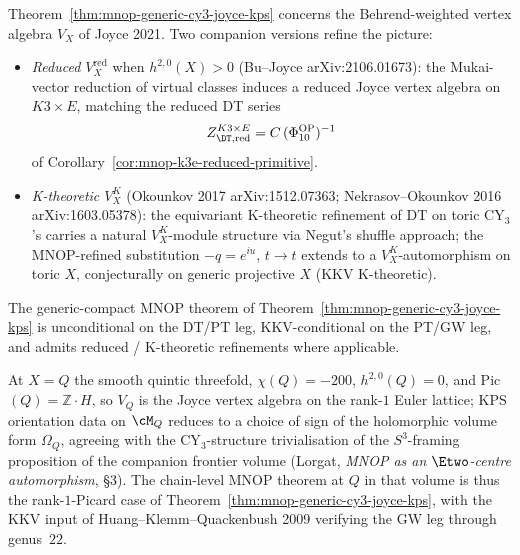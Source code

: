 \begin{remark}
\label{rem:three-vx-versions}
Theorem~\ref{thm:mnop-generic-cy3-joyce-kps} concerns the
Behrend-weighted vertex algebra $V_X$ of Joyce 2021. Two companion
versions refine the picture:
\begin{itemize}
\item \emph{Reduced $V_X^{\mathrm{red}}$} when $h^{2,0}(X) > 0$
(Bu--Joyce arXiv:2106.01673): the Mukai-vector reduction of virtual
classes induces a reduced Joyce vertex algebra on $K3\times E$,
matching the reduced DT series
\[
Z^{K3\times E}_{\DT, \mathrm{red}}
=
C\,(\Phi_{10}^{\mathrm{OP}})^{-1}
\]
of Corollary~\ref{cor:mnop-k3e-reduced-primitive}.
\item \emph{K-theoretic $V_X^{K}$} (Okounkov 2017
arXiv:1512.07363; Nekrasov--Okounkov 2016 arXiv:1603.05378): the
equivariant K-theoretic refinement of DT on toric CY$_3$'s carries
a natural $V_X^{K}$-module structure via Negut's shuffle approach;
the MNOP-refined substitution $-q = e^{i u}$, $t\to t$ extends to
a $V_X^{K}$-automorphism on toric $X$, conjecturally on generic
projective $X$ (KKV K-theoretic).
\end{itemize}
The generic-compact MNOP theorem of
Theorem~\ref{thm:mnop-generic-cy3-joyce-kps} is unconditional on the
DT/PT leg, KKV-conditional on the PT/GW leg, and admits reduced /
K-theoretic refinements where applicable.
\end{remark}

\begin{remark}
\label{rem:mnop-generic-recovers-quintic}
At $X = Q$ the smooth quintic threefold, $\chi(Q) = -200$,
$h^{2,0}(Q) = 0$, and Pic$(Q) = \mathbb{Z}\cdot H$, so $V_Q$ is the
Joyce vertex algebra on the rank-$1$ Euler lattice; KPS orientation data
on $\cM_Q$ reduces to a choice of sign of the holomorphic volume form
$\Omega_Q$, agreeing with the CY$_3$-structure trivialisation of
the $S^3$-framing proposition of the companion frontier volume (Lorgat,
\emph{MNOP as an $\Etwo$-centre automorphism}, \S3). The chain-level
MNOP theorem at $Q$ in that volume is
thus the rank-$1$-Picard case of
Theorem~\ref{thm:mnop-generic-cy3-joyce-kps}, with the KKV input of
Huang--Klemm--Quackenbush 2009 verifying the GW leg through genus~$22$.
\end{remark}

